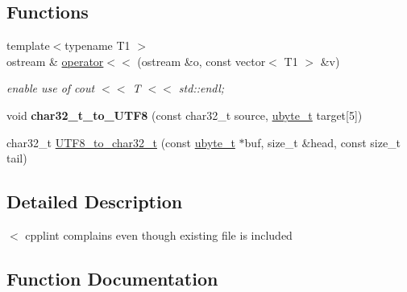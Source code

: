 \subsection*{Functions}
\begin{DoxyCompactItemize}
\item 
\hypertarget{namespacejlettvin_ae776f6a66f5697c5cb2afb2c6efdbfd7}{}{\footnotesize template$<$typename T1 $>$ }\\ostream \& \hyperlink{namespacejlettvin_ae776f6a66f5697c5cb2afb2c6efdbfd7}{operator$<$$<$} (ostream \&o, const vector$<$ T1 $>$ \&v)\label{namespacejlettvin_ae776f6a66f5697c5cb2afb2c6efdbfd7}

\begin{DoxyCompactList}\small\item\em enable use of cout $<$$<$ T $<$$<$ std\+::endl; \end{DoxyCompactList}\item 
\hypertarget{namespacejlettvin_ab09212af893947acc85d4e6138b60ba2}{}void {\bfseries char32\+\_\+t\+\_\+to\+\_\+\+U\+T\+F8} (const char32\+\_\+t source, \hyperlink{namespacejlettvin_a7c7cf84f4fd67858c46a1077ed2e3ad4}{ubyte\+\_\+t} target\mbox{[}5\mbox{]})\label{namespacejlettvin_ab09212af893947acc85d4e6138b60ba2}

\item 
char32\+\_\+t \hyperlink{namespacejlettvin_ae1f5a0c22c3f8c9eecb88f086bcbcc30}{U\+T\+F8\+\_\+to\+\_\+char32\+\_\+t} (const \hyperlink{namespacejlettvin_a7c7cf84f4fd67858c46a1077ed2e3ad4}{ubyte\+\_\+t} $\ast$buf, size\+\_\+t \&head, const size\+\_\+t tail)
\end{DoxyCompactItemize}


\subsection{Detailed Description}
$<$ cpplint complains even though existing file is included 

\subsection{Function Documentation}
\hypertarget{namespacejlettvin_ae1f5a0c22c3f8c9eecb88f086bcbcc30}{}
